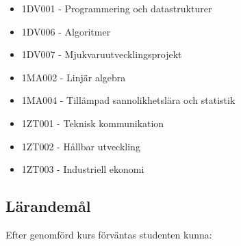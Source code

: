 \begin{itemize}
\tightlist
\item
  1DV001 - Programmering och datastrukturer
\item
  1DV006 - Algoritmer
\item
  1DV007 - Mjukvaruutvecklingsprojekt
\item
  1MA002 - Linjär algebra
\item
  1MA004 - Tillämpad sannolikhetslära och statistik
\item
  1ZT001 - Teknisk kommunikation
\item
  1ZT002 - Hållbar utveckling
\item
  1ZT003 - Industriell ekonomi
\end{itemize}

\subsection*{Lärandemål}

Efter genomförd kurs förväntas studenten kunna:

